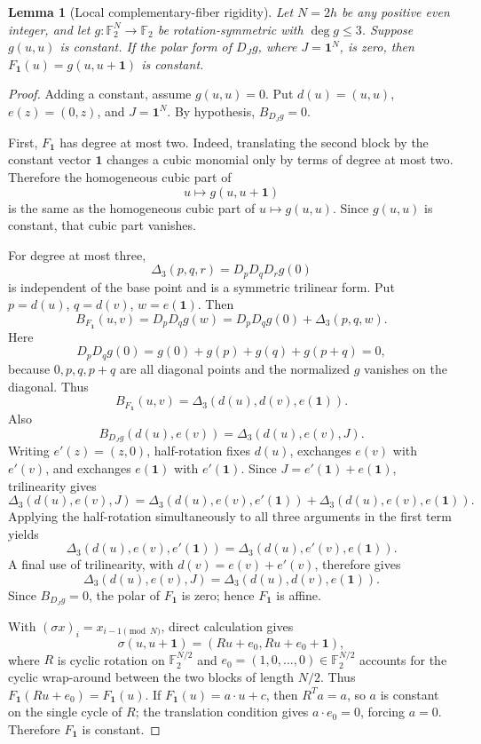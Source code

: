 \documentclass[11pt,a4paper]{article}
\newtheorem{lemma}[theorem]{Lemma}
\theoremstyle{remark}
\theoremstyle{plain}
\newcommand{\F}{\mathbb F_2}
\begin{document}
\begin{lemma}[Local complementary-fiber rigidity]\label{lem:fiber-rigidity}
Let \(N=2h\) be any positive even integer, and let \(g:\F^N\to\F\) be rotation-symmetric with \(\deg g\le3\). Suppose \(g(u,u)\) is constant. If the polar form of \(D_Jg\), where \(J=\mathbf1^N\), is zero, then \(F_{\mathbf1}(u)=g(u,u+\mathbf1)\) is constant.
\end{lemma}
\begin{proof}
Adding a constant, assume \(g(u,u)=0\). Put \(d(u)=(u,u)\), \(e(z)=(0,z)\), and \(J=\mathbf1^N\). By hypothesis, \(B_{D_Jg}=0\).

First, $F_{\mathbf1}$ has degree at most two. Indeed, translating the second block by the constant vector $\mathbf1$ changes a cubic monomial only by terms of degree at most two. Therefore the homogeneous cubic part of
\[
u\longmapsto g(u,u+\mathbf1)
\]
is the same as the homogeneous cubic part of $u\mapsto g(u,u)$. Since $g(u,u)$ is constant, that cubic part vanishes.

For degree at most three,
\[
\Delta_3(p,q,r)=D_pD_qD_rg(0)
\]
is independent of the base point and is a symmetric trilinear form. Put \(p=d(u)\), \(q=d(v)\), \(w=e(\mathbf1)\). Then
\[
B_{F_{\mathbf1}}(u,v)=D_pD_qg(w)
=D_pD_qg(0)+\Delta_3(p,q,w).
\]
Here
\[
D_pD_qg(0)=g(0)+g(p)+g(q)+g(p+q)=0,
\]
because \(0,p,q,p+q\) are all diagonal points and the normalized \(g\) vanishes on the diagonal. Thus
\[
B_{F_{\mathbf1}}(u,v)=\Delta_3(d(u),d(v),e(\mathbf1)).
\]
Also
\[
B_{D_Jg}(d(u),e(v))=\Delta_3(d(u),e(v),J).
\]
Writing \(e'(z)=(z,0)\), half-rotation fixes \(d(u)\), exchanges \(e(v)\) with \(e'(v)\), and exchanges \(e(\mathbf1)\) with \(e'(\mathbf1)\). Since \(J=e'(\mathbf1)+e(\mathbf1)\), trilinearity gives
\[
\Delta_3(d(u),e(v),J)
=\Delta_3(d(u),e(v),e'(\mathbf1))
 +\Delta_3(d(u),e(v),e(\mathbf1)).
\]
Applying the half-rotation simultaneously to all three arguments in the first term yields
\[
\Delta_3(d(u),e(v),e'(\mathbf1))
=\Delta_3(d(u),e'(v),e(\mathbf1)).
\]
A final use of trilinearity, with \(d(v)=e(v)+e'(v)\), therefore gives
\[
\Delta_3(d(u),e(v),J)
=\Delta_3(d(u),d(v),e(\mathbf1)).
\]
Since \(B_{D_Jg}=0\), the polar of \(F_{\mathbf1}\) is zero; hence \(F_{\mathbf1}\) is affine.

With \((\sigma x)_i=x_{i-1\pmod N}\), direct calculation gives
\[
\sigma(u,u+\mathbf1)=(Ru+e_0,Ru+e_0+\mathbf1),
\]
where \(R\) is cyclic rotation on \(\F^{N/2}\) and \(e_0=(1,0,\dots,0)\in\F^{N/2}\) accounts for the cyclic wrap-around between the two blocks of length \(N/2\). Thus \(F_{\mathbf1}(Ru+e_0)=F_{\mathbf1}(u)\). If \(F_{\mathbf1}(u)=a\cdot u+c\), then \(R^Ta=a\), so \(a\) is constant on the single cycle of \(R\); the translation condition gives \(a\cdot e_0=0\), forcing \(a=0\). Therefore \(F_{\mathbf1}\) is constant.
\end{proof}
\end{document}
